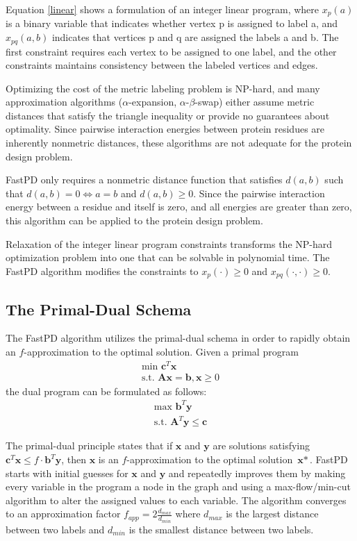 \documentclass[11pt]{article}
\begin{document}
	Equation \ref{linear} shows a formulation of an integer linear program, where
	$x_p(a)$ is a binary variable that indicates whether vertex p is assigned to
	label a, and $x_{pq}(a,b)$ indicates that vertices p and q are assigned the
	labels a and b.  The first constraint requires each vertex to be assigned to
	one label, and the other constraints maintains consistency between the labeled
	vertices and edges.
	
	Optimizing the cost of the metric labeling problem is NP-hard, and many
	approximation algorithms ($\alpha$-expansion, $\alpha$-$\beta$-swap) either
	assume metric distances that satisfy the triangle inequality or provide no
	guarantees about optimality.  Since pairwise interaction energies between
	protein residues are inherently nonmetric distances, these algorithms are not
	adequate for the protein design problem.  
	
	FastPD only requires a nonmetric distance function that satisfies $d(a,b)$ such
	that $d(a,b)=0 \iff a=b$ and $d(a,b) \geq 0$.  Since the pairwise interaction
	energy between a residue and itself is zero, and all energies are greater than
	zero, this algorithm can be applied to the protein design problem.  
	
	Relaxation of the integer linear program constraints transforms the NP-hard
	optimization problem into one that can be solvable in polynomial time.  The 
	FastPD algorithm modifies the constraints to 
	$x_p(\cdot) \ge 0$ and $x_{pq}(\cdot, \cdot) \ge 0$.  

	\subsection{The Primal-Dual Schema}	
	
	The FastPD algorithm utilizes the primal-dual schema in order to rapidly obtain
	an $f$-approximation to the optimal solution. Given a primal program
	\begin{gather*}
	\text{min }\textbf{c}^T\textbf{x} \\
	\text{s.t. }\textbf{Ax} = \textbf{b}, \textbf{x} \geq 0
	\end{gather*}
	the dual program can be formulated as follows:
	\begin{gather*}
	\text{max } \textbf{b}^T\textbf{y} \\
	\text{s.t. }\textbf{A}^T\textbf{y} \leq \textbf{c} 
	\end{gather*}		

	The primal-dual principle states that if $\textbf{x}$ and $\textbf{y}$ are
	solutions satisfying $\textbf{c}^T\textbf{x} \leq f \cdot \textbf{b}^T\textbf{y}$,
	then $\textbf{x}$ is an $f$-approximation to the optimal solution $\textbf{x}*$.
	FastPD starts with initial guesses for $\textbf{x}$ and $\textbf{y}$ and 
	repeatedly improves them by making every variable in the program a node in the
	graph and using a max-flow/min-cut algorithm to alter the assigned values to
	each variable. The algorithm converges to an approximation factor
	$f_{app} = 2 \frac{d_{max}}{d_{min}}$ where $d_{max}$ is the largest distance
	between two labels and $d_{min}$ is the smallest distance between two labels. 
	
\end{document}
